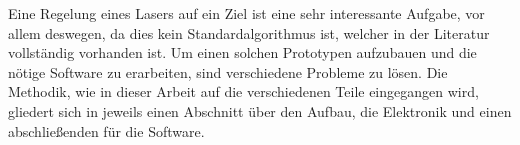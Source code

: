 Eine Regelung eines Lasers auf ein Ziel ist eine sehr interessante Aufgabe, vor allem deswegen, da dies kein Standardalgorithmus ist, welcher in der Literatur vollständig vorhanden ist.
Um einen solchen Prototypen aufzubauen und die nötige Software zu erarbeiten, sind verschiedene Probleme zu lösen.
Die Methodik, wie in dieser Arbeit auf die verschiedenen Teile eingegangen wird, gliedert sich in jeweils einen Abschnitt über den Aufbau, die Elektronik und einen abschließenden für die Software.






